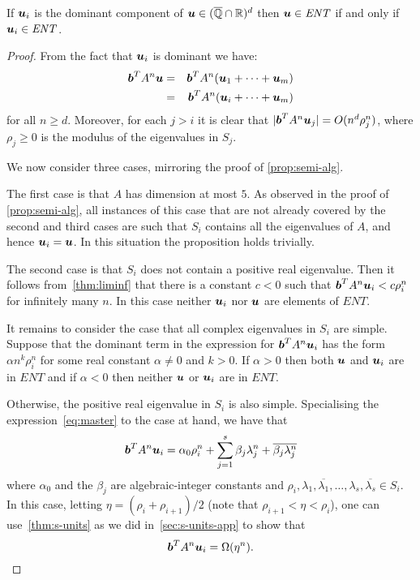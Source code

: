 \begin{proposition}
  If $\boldsymbol{u}_i$ is the dominant component of $\boldsymbol{u}
  \in (\overline{\mathbb{Q}}\cap\mathbb{R})^{d}$ then $\boldsymbol{u}\in\mathit{ENT}$ if and only
if $\boldsymbol{u}_i \in \mathit{ENT}$.
\label{prop:dominant}
\end{proposition}
\begin{proof}
From the fact that $\boldsymbol{u}_i$ is dominant we have:
\begin{eqnarray}
 \myvector{b}^TA^n\myvector{u}&=&
   \myvector{b}^TA^n(\myvector{u}_1+\cdots+\myvector{u}_m) \notag\\
&=&\myvector{b}^TA^n(\myvector{u}_i+\cdots+\myvector{u}_m)
\label{eq:part}
\end{eqnarray}
for all $n\geq d$.  Moreover, for each $j>i$ it is clear that
  $|\boldsymbol{b}^TA^n\boldsymbol{u}_j| = O(n^{d}\rho_j^n)$, where
  $\rho_j\geq 0$ is the modulus of the eigenvalues in $S_j$.

  We now consider three cases, mirroring the proof of
  \cref{prop:semi-alg}.

  The first case is that $A$ has dimension at most $5$.  As observed
  in the proof of \cref{prop:semi-alg}, all instances of
  this case that are not already covered by the second and third cases
  are such that $S_i$ contains all the eigenvalues of $A$, and hence
  $\boldsymbol{u}_i=\boldsymbol{u}$.  In this situation the proposition
  holds trivially.

  The second case is that $S_i$ does not contain a positive real
  eigenvalue.  Then it follows from~\cref{thm:liminf} that there
  is a constant $c<0$ such that
  $\boldsymbol{b}^{T} A^{n} \boldsymbol{u}_{i} < c \rho_{i}^{n}$ for infinitely many $n$.  In this case neither $\boldsymbol{u}_i$ nor $\boldsymbol{u}$
  are elements of $\mathit{ENT}$.

  It remains to consider the case that all complex eigenvalues in
  $S_i$ are simple.  Suppose that the dominant term in the expression
  for $\boldsymbol{b}^TA^n\boldsymbol{u}_i$ has the form $\alpha
  n^k\rho_i^n$ for some real constant $\alpha\neq 0$ and $k>0$.  If
  $\alpha>0$ then both $\boldsymbol{u}$ and $\boldsymbol{u}_i$ are in
  $\mathit{ENT}$ and if $\alpha<0$ then neither $\boldsymbol{u}$ or
  $\boldsymbol{u}_i$ are in $\mathit{ENT}$.

  Otherwise, the positive real eigenvalue in $S_{i}$ is also simple. Specialising the expression~\eqref{eq:master} to the case
  at hand, we have that
\begin{gather}
\label{eq:diag}
 \myvector{b}^TA^n\myvector{u}_i = \alpha_0 \rho_i^n+\sum\limits_{j=1}^s\beta_j\lambda_j^n+\overline{\beta_j\lambda_j^n}
\end{gather}
where $\alpha_0$ and the $\beta_j$ are algebraic-integer constants and
$\rho_i,\lambda_1,\overline{\lambda_1},\ldots,\lambda_s,\overline{\lambda_s} \in S_i$.  In this case, letting $\eta = (\rho_{i} + \rho_{i+1})/2$ (note that $\rho_{i+1} < \eta < \rho_{i}$), one can use~\cref{thm:s-units} as we did in~\cref{sec:s-units-app} to show that
\begin{equation*}
  \boldsymbol{b}^{T} A^{n} \boldsymbol{u}_{i} = \Omega(\eta^{n}).
\end{equation*}


\end{proof}
